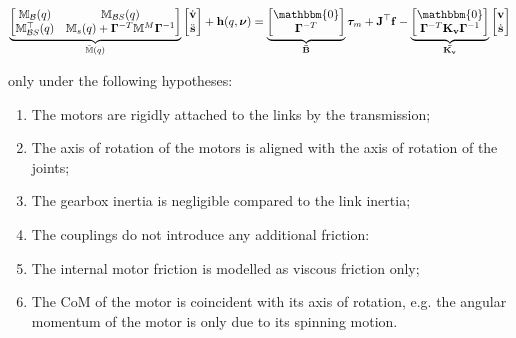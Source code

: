 \begin{equation}
    \underbrace{\begin{bmatrix}
            \mathbb{M} _{\mathcal{B}}(q)        & \mathbb{M} _{\mathcal{B}S}(q)                                                      \\
            \mathbb{M} _{\mathcal{B}S} ^\top(q) & \mathbb{M} _s(q) + \boldsymbol{\Gamma} ^{-T}\mathbb{M} ^M\boldsymbol{\Gamma} ^{-1}
        \end{bmatrix}} _{\bar{\mathbb{M}}(q)}
    \begin{bmatrix}
        \dot{\mathrm{\mathbf{v}}} \\
        \ddot{\mathbf{s}}
    \end{bmatrix}+
    \mathbf{h}
    (q,\boldsymbol{\nu}) =
    \underbrace{\begin{bmatrix}
            \mathbbm{0} \\
            \boldsymbol{\Gamma} ^{-T}
        \end{bmatrix}} _{\mathbf{\bar{B}}}
    \boldsymbol{\tau} _m
    +
    \mathbf{J} ^\top
    \mathbf{f}
    -
    \underbrace{\begin{bmatrix}
            \mathbbm{0} \\
            \boldsymbol{\Gamma} ^{-T}\mathbf{K _v}\boldsymbol{\Gamma} ^{-1}
        \end{bmatrix}} _\mathbf{\bar{K _v}}
    \begin{bmatrix}
        \mathrm{\mathbf{v}} \\
        \dot{\mathbf{s}}
    \end{bmatrix}
\end{equation}

only under the following hypotheses:

\begin{enumerate}
    \item The motors are rigidly attached to the links by the transmission;
    \item The axis of rotation of the motors is aligned with the axis of rotation of the joints;
    \item The gearbox inertia is negligible compared to the link inertia;
    \item The couplings do not introduce any additional friction:
    \item The internal motor friction is modelled as viscous friction only;
    \item The \ac{CoM} of the motor is coincident with its axis of rotation, e.g. the angular momentum of the motor is only due to its spinning motion.
\end{enumerate}

